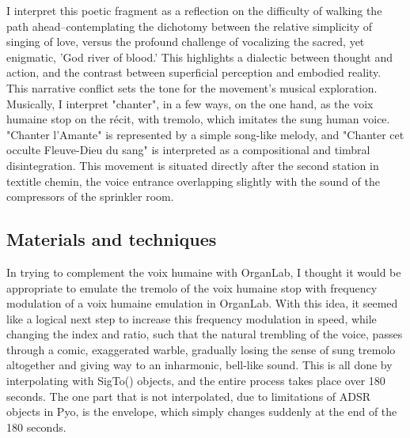\documentclass[12pt,twoside,maitrise]{dms_ks}
\theoremstyle{definition}
\begin{document}
I interpret this poetic fragment as a reflection on the difficulty of walking the path ahead--contemplating the dichotomy between the relative simplicity of singing of love, versus the profound challenge of vocalizing the sacred, yet enigmatic, 'God river of blood.'  
This highlights a dialectic between thought and action, and the contrast between superficial perception and embodied reality.  
This narrative conflict sets the tone for the movement's musical exploration.  
Musically, I interpret "chanter", in a few ways, on the one hand, as the voix humaine stop on the récit, with tremolo, which imitates the sung human voice.  
"Chanter l'Amante" is represented by a simple song-like melody, and "Chanter cet occulte Fleuve-Dieu du sang" is interpreted as a compositional and timbral disintegration. 
This movement is situated directly after the second station in textit{le chemin}, the voice entrance overlapping slightly with the sound of the compressors of the sprinkler room.

\subsection{Materials and techniques}

In trying to complement the voix humaine with OrganLab, I thought it would be appropriate to emulate the tremolo of the voix humaine stop with frequency modulation of a voix humaine emulation in OrganLab.  
With this idea, it seemed like a logical next step to increase this frequency modulation in speed, while changing the index and ratio, such that the natural trembling of the voice, passes through a comic, exaggerated warble, gradually losing the sense of sung tremolo altogether and giving way to an inharmonic, bell-like sound.  
This is all done by interpolating with SigTo() objects, and the entire process takes place over 180 seconds.  
The one part that is not interpolated, due to limitations of ADSR objects in Pyo, is the envelope, which simply changes suddenly at the end of the 180 seconds.
\end{document}
